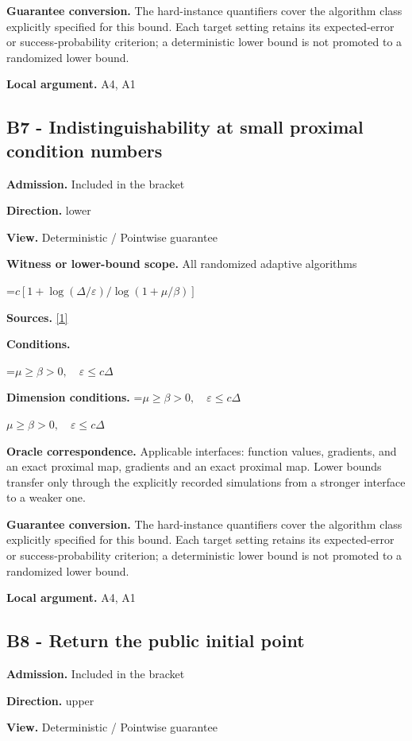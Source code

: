 \documentclass[10pt,a4paper]{article}
\newcommand{\AtlasMath}[1]{\par\begingroup\centering\setbox0=\hbox{$\displaystyle #1$}\ifdim\wd0>1.4\linewidth\typeout{ATLAS WIDE FORMULA: \the\wd0}\fi\ifdim\wd0>\linewidth\resizebox{\linewidth}{!}{\box0}\else\box0\fi\par\endgroup}
\newcommand{\AtlasInlineMath}[1]{\begingroup\setbox0=\hbox{$#1$}\ifdim\wd0>.4\linewidth\endgroup\AtlasMath{#1}\else\endgroup$#1$\fi}
\begin{document}
\textbf{Guarantee conversion.} The hard-instance quantifiers cover the algorithm class explicitly specified for this bound. Each target setting retains its expected-error or success-probability criterion; a deterministic lower bound is not promoted to a randomized lower bound.

\textbf{Local argument.} A4, A1

\subsection{B7 - Indistinguishability at small proximal condition numbers}
\textbf{Admission.} Included in the bracket

\textbf{Direction.} lower

\textbf{View.} Deterministic / Pointwise guarantee

\textbf{Witness or lower-bound scope.} All randomized adaptive algorithms

\AtlasMath{c[1+\log(\Delta/\varepsilon)/\log(1+\mu/\beta)]}
\textbf{Sources.} \href{https://www.tau.ac.il/~becka/FISTA.pdf}{[1]}

\textbf{Conditions.} 
\AtlasMath{\mu\ge\beta>0,\quad\varepsilon\le c\Delta}


\textbf{Dimension conditions.} \AtlasInlineMath{\mu\ge\beta>0,\quad\varepsilon\le c\Delta}

\textbf{Oracle correspondence.} Applicable interfaces: function values, gradients, and an exact proximal map, gradients and an exact proximal map. Lower bounds transfer only through the explicitly recorded simulations from a stronger interface to a weaker one.

\textbf{Guarantee conversion.} The hard-instance quantifiers cover the algorithm class explicitly specified for this bound. Each target setting retains its expected-error or success-probability criterion; a deterministic lower bound is not promoted to a randomized lower bound.

\textbf{Local argument.} A4, A1

\subsection{B8 - Return the public initial point}
\textbf{Admission.} Included in the bracket

\textbf{Direction.} upper

\textbf{View.} Deterministic / Pointwise guarantee
\end{document}
